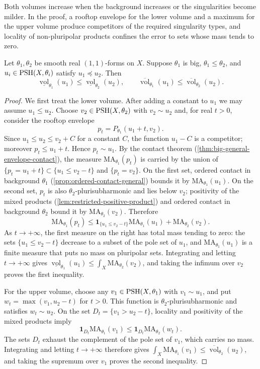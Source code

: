 Both volumes increase when the background increases or the singularities become milder. In the proof, a rooftop envelope for the lower volume and a maximum for the upper volume produce competitors of the required singularity types, and locality of non-pluripolar products confines the error to sets whose mass tends to zero.

\begin{theorem}\label{thm:volume-monotonicity}
Let $\theta_1,\theta_2$ be smooth real $(1,1)$-forms on $X$. Suppose $\theta_1$ is big, $\theta_1\leq\theta_2$, and $u_i\in\mathrm{PSH}(X,\theta_i)$ satisfy $u_1\preceq u_2$. Then
\[
 \underline{\operatorname{vol}}_{\theta_1}(u_1)
 \leq\underline{\operatorname{vol}}_{\theta_2}(u_2),\qquad
 \overline{\operatorname{vol}}_{\theta_1}(u_1)
 \leq\overline{\operatorname{vol}}_{\theta_2}(u_2).
\]
\end{theorem}
\begin{proof}
We first treat the lower volume. After adding a constant to $u_1$ we may assume $u_1\leq u_2$. Choose $v_2\in\mathrm{PSH}(X,\theta_2)$ with $v_2\sim u_2$ and, for real $t>0$, consider the rooftop envelope
\[
 p_t=P_{\theta_1}(u_1+t,v_2).
\]
Since $u_1\leq u_2\leq v_2+C$ for a constant $C$, the function $u_1-C$ is a competitor; moreover $p_t\leq u_1+t$. Hence $p_t\sim u_1$. By the contact theorem (\cref{thm:big-general-envelope-contact}), the measure $\mathrm{MA}_{\theta_1}(p_t)$ is carried by the union of $\{p_t=u_1+t\}\subset\{u_1\leq v_2-t\}$ and $\{p_t=v_2\}$. On the first set, ordered contact in background $\theta_1$ (\cref{prop:ordered-contact-general}) bounds it by $\mathrm{MA}_{\theta_1}(u_1)$. On the second set, $p_t$ is also $\theta_2$-plurisubharmonic and lies below $v_2$; positivity of the mixed products (\cref{lem:restricted-positive-product}) and ordered contact in background $\theta_2$ bound it by $\mathrm{MA}_{\theta_2}(v_2)$. Therefore
\[
 \mathrm{MA}_{\theta_1}(p_t)
 \leq\mathbf1_{\{u_1\leq v_2-t\}}\mathrm{MA}_{\theta_1}(u_1)
      +\mathrm{MA}_{\theta_2}(v_2).
\]
As $t\to+\infty$, the first measure on the right has total mass tending to zero: the sets $\{u_1\leq v_2-t\}$ decrease to a subset of the pole set of $u_1$, and $\mathrm{MA}_{\theta_1}(u_1)$ is a finite measure that puts no mass on pluripolar sets. Integrating and letting $t\to+\infty$ gives $\underline{\operatorname{vol}}_{\theta_1}(u_1)\leq\int_X\mathrm{MA}_{\theta_2}(v_2)$, and taking the infimum over $v_2$ proves the first inequality.

For the upper volume, choose any $v_1\in\mathrm{PSH}(X,\theta_1)$ with $v_1\sim u_1$, and put $w_t=\max(v_1,u_2-t)$ for $t>0$. This function is $\theta_2$-plurisubharmonic and satisfies $w_t\sim u_2$. On the set $D_t=\{v_1>u_2-t\}$, locality and positivity of the mixed products imply
\[
 \mathbf1_{D_t}\mathrm{MA}_{\theta_1}(v_1)
 \leq\mathbf1_{D_t}\mathrm{MA}_{\theta_2}(w_t).
\]
The sets $D_t$ exhaust the complement of the pole set of $v_1$, which carries no mass. Integrating and letting $t\to+\infty$ therefore gives
$\int_X\mathrm{MA}_{\theta_1}(v_1)\leq
\overline{\operatorname{vol}}_{\theta_2}(u_2)$,
and taking the supremum over $v_1$ proves the second inequality.
\end{proof}

